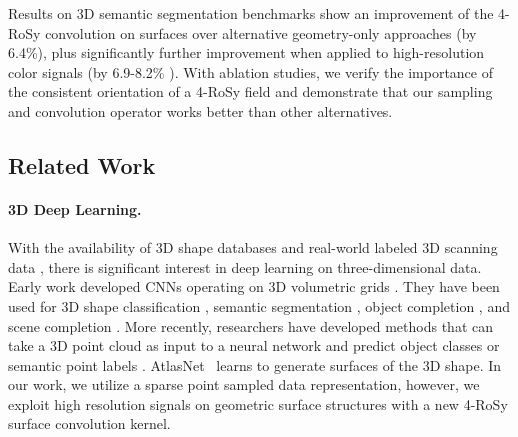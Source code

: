 Results on 3D semantic segmentation benchmarks show an improvement of the 4-RoSy convolution on surfaces over alternative geometry-only approaches (by 6.4\%), plus significantly further improvement when applied to high-resolution color signals (by 6.9-8.2\% ).  With ablation studies, we verify the importance of the consistent orientation of a 4-RoSy field and demonstrate that our sampling and convolution operator works better than other alternatives.

\subsection{Related Work}
\label{related:texturenet}
\paragraph*{3D Deep Learning.}
With the availability of 3D shape databases \cite{wu20153d,chang2015shapenet,song2017semantic} and real-world labeled 3D scanning data \cite{song2015sun,armeni2017joint,dai2017scannet,chang2017matterport3d}, there is significant interest in deep learning on three-dimensional data.   Early work developed CNNs operating on 3D volumetric grids \cite{wu20153d,maturana2015voxnet}.  They have been used for 3D shape classification  \cite{qi2016volumetric,riegler2017octnet}, semantic  segmentation \cite{dai2017scannet,dai2018scancomplete}, object completion \cite{dai2017shape}, and scene completion \cite{dai2018scancomplete}.   More recently, researchers have developed methods that can take a 3D point cloud as input to a neural network and predict object classes or semantic point labels \cite{qi2017pointnet,qi2017pointnet++,tatarchenko2018tangent,su2018splatnet,atzmon2018point}.  AtlasNet~\cite{groueix2018papier} learns to generate surfaces of the 3D shape.  In our work, we utilize a sparse point sampled data representation, however, we exploit high resolution signals on geometric surface structures with a new 4-RoSy surface convolution kernel.

